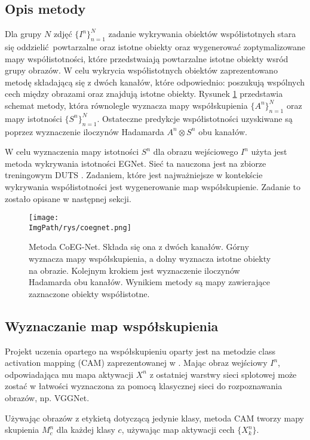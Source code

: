 \documentclass[a4paper,12pt,twoside,openany]{report}
\newcommand{\ImgPath}{.}
\begin{document}
\subsection{Opis metody}
Dla grupy $N$ zdjęć $\{I^n\}^N_{n=1}$ zadanie wykrywania obiektów współistotnych stara się oddzielić powtarzalne oraz istotne obiekty oraz wygenerować zoptymalizowane mapy współistotności, które przedstwaiają powtarzalne istotne obiekty wsród grupy obrazów. W celu wykrycia współistotnych obiektów zaprezentowano metodę składającą się z dwóch kanałów, które odpowiednio: poszukują wspólnych cech między obrazami oraz znajdują istotne obiekty. Rysunek \ref{coegnet} przedstawia schemat metody, która równolegle wyznacza mapy współskupienia $\{A^n\}^N_{n=1}$ oraz mapy istotności $\{S^n\}^N_{n=1}$. Ostateczne predykcje współistotności uzyskiwane są poprzez wyznaczenie iloczynów Hadamarda $A^n \otimes S^n$ obu kanałów.

W celu wyznaczenia mapy istotności $S^n$ dla obrazu wejściowego $I^n$ użyta jest metoda wykrywania istotności EGNet. Sieć ta nauczona jest na zbiorze treningowym DUTS \cite{duts}. Zadaniem, które jest najważniejsze w kontekście wykrywania współistotności jest wygenerowanie map współskupienie. Zadanie to zostało opisane w następnej sekcji.

\begin{figure}[h]
	\centering
	\texttt{[image: \\ImgPath/rys/coegnet.png]}
	\caption{Metoda CoEG-Net. Składa się ona z dwóch kanałów. Górny wyznacza mapy współskupienia, a dolny wyznacza istotne obiekty na obrazie. Kolejnym krokiem jest wyznaczenie iloczynów Hadamarda obu kanałów. Wynikiem metody są mapy zawierające zaznaczone obiekty współistotne.}
	\label{coegnet}
\end{figure}

\subsection{Wyznaczanie map współskupienia}
Projekt uczenia opartego na współskupieniu oparty jest na metodzie class
activation mapping (CAM) zaprezentowanej w \cite{cam}. Mając obraz wejściowy $I^n$, odpowiadająca mu mapa aktywacji $X^n$ z ostatniej warstwy sieci splotowej może zostać w łatwości wyznaczona za pomocą klasycznej sieci do rozpoznawania obrazów, np. VGGNet. 

Używając obrazów z etykietą dotyczącą jedynie klasy, metoda CAM tworzy mapy skupienia $M^n_c$ dla każdej klasy $c$, używając map aktywacji cech $\{X^n_k\}$.
\end{document}
